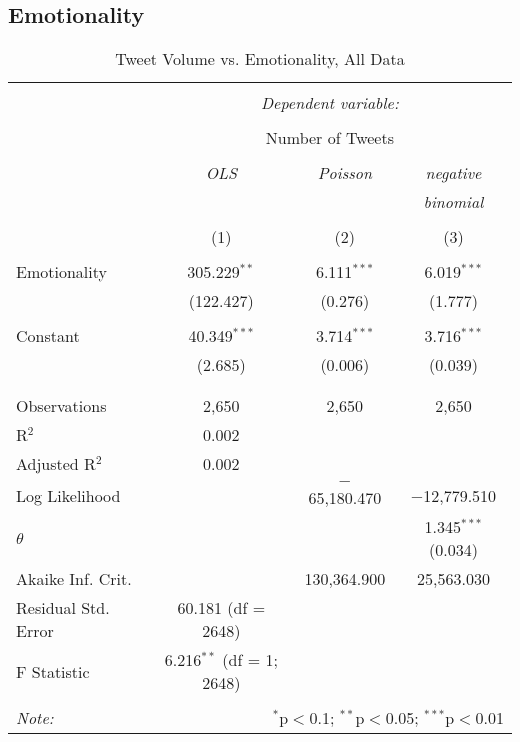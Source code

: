 \subsection{Emotionality}

\begin{table}[H] \centering 
  \caption{Tweet Volume vs. Emotionality, All Data} 
  \label{} 
    \begin{tabular}{@{\extracolsep{5pt}}lccc} 
    \\[-1.8ex]\hline 
    \hline \\[-1.8ex] 
     & \multicolumn{3}{c}{\textit{Dependent variable:}} \\ 
    \cline{2-4} 
    \\[-1.8ex] & \multicolumn{3}{c}{Number of Tweets} \\ 
    \\[-1.8ex] & \textit{OLS} & \textit{Poisson} & \textit{negative} \\ 
     & \textit{} & \textit{} & \textit{binomial} \\ 
    \\[-1.8ex] & (1) & (2) & (3)\\ 
    \hline \\[-1.8ex] 
     Emotionality & 305.229$^{**}$ & 6.111$^{***}$ & 6.019$^{***}$ \\ 
      & (122.427) & (0.276) & (1.777) \\ 
      & & & \\ 
     Constant & 40.349$^{***}$ & 3.714$^{***}$ & 3.716$^{***}$ \\ 
      & (2.685) & (0.006) & (0.039) \\ 
      & & & \\ 
    \hline \\[-1.8ex] 
    Observations & 2,650 & 2,650 & 2,650 \\ 
    R$^{2}$ & 0.002 &  &  \\ 
    Adjusted R$^{2}$ & 0.002 &  &  \\ 
    Log Likelihood &  & $-$65,180.470 & $-$12,779.510 \\ 
    $\theta$ &  &  & 1.345$^{***}$  (0.034) \\ 
    Akaike Inf. Crit. &  & 130,364.900 & 25,563.030 \\ 
    Residual Std. Error & 60.181 (df = 2648) &  &  \\ 
    F Statistic & 6.216$^{**}$ (df = 1; 2648) &  &  \\ 
    \hline 
    \hline \\[-1.8ex] 
    \textit{Note:}  & \multicolumn{3}{r}{$^{*}$p$<$0.1; $^{**}$p$<$0.05; $^{***}$p$<$0.01} \\ 
    \end{tabular} 
\end{table} 
